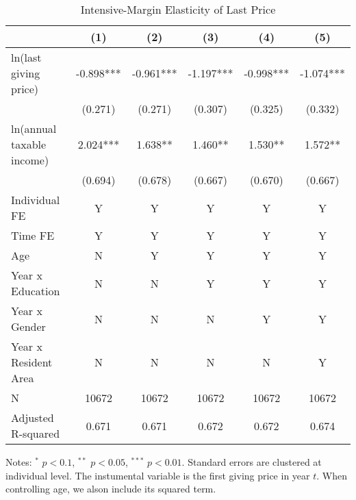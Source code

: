 \documentclass[
  11pt,
  a4paper,
]{article}
\begin{document}
\begin{table}

\caption{\label{tab:LastIntensive}Intensive-Margin Elasticity of Last Price}
\centering
\fontsize{7}{9}\selectfont
\begin{threeparttable}
\begin{tabular}[t]{lccccc}
\toprule
 & (1) & (2) & (3) & (4) & (5)\\
\midrule
ln(last giving price) & -0.898*** & -0.961*** & -1.197*** & -0.998*** & -1.074***\\
 & (0.271) & (0.271) & (0.307) & (0.325) & (0.332)\\
ln(annual taxable income) & 2.024*** & 1.638** & 1.460** & 1.530** & 1.572**\\
 & (0.694) & (0.678) & (0.667) & (0.670) & (0.667)\\
Individual FE & Y & Y & Y & Y & Y\\
Time FE & Y & Y & Y & Y & Y\\
Age & N & Y & Y & Y & Y\\
Year x Education & N & N & Y & Y & Y\\
Year x Gender & N & N & N & Y & Y\\
Year x Resident Area & N & N & N & N & Y\\
N & 10672 & 10672 & 10672 & 10672 & 10672\\
Adjusted R-squared & 0.671 & 0.671 & 0.672 & 0.672 & 0.674\\
\bottomrule
\end{tabular}
\begin{tablenotes}
\item Notes: $^{*}$ $p < 0.1$, $^{**}$ $p < 0.05$, $^{***}$ $p < 0.01$. Standard errors are clustered at individual level. The instumental variable is the first giving price in year $t$. When controlling age, we alson include its squared term.
\end{tablenotes}
\end{threeparttable}
\end{table}
\end{document}
